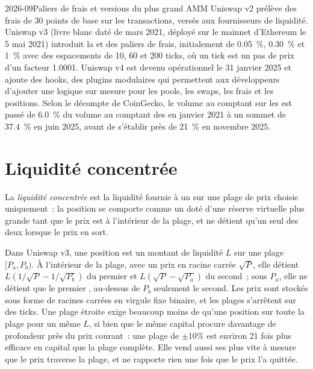 \begin{dated}{2026-09}{Paliers de frais et versions du plus grand AMM}\label{dat:m3:automated-market-makers:uniswap}
Uniswap v2 prélève des frais de 30 points de base sur les transactions, versés aux fournisseurs de liquidité. Uniswap v3 (livre blanc daté de mars 2021, déployé sur
le mainnet d'Ethereum le 5 mai 2021)
introduit la  et des paliers de frais, initialement de 0.05~\%, 0.30~\% et 1~\% avec des espacements de 10, 60 et 200 ticks,
où un tick est un pas de prix d'un facteur 1.0001. Uniswap v4 est devenu opérationnel le 31 janvier 2025 et ajoute des hooks, des plugins modulaires
qui permettent aux développeurs d'ajouter une logique sur mesure pour les pools, les swaps, les frais et les positions. Selon le décompte de CoinGecko, le volume au comptant sur les 
est passé de 6.0~\% du volume au comptant des  en janvier 2021 à un sommet de 37.4~\% en juin 2025, avant de s'établir près de 21~\% en novembre 2025.
\end{dated}

\section{Liquidité concentrée}

\begin{definition}\label{def:m3:automated-market-makers:concentrated}
La \emph{liquidité concentrée} est la liquidité fournie à un  sur
une plage de prix choisie uniquement~: la position se comporte comme un  doté d'une réserve virtuelle plus grande tant que le prix est
à l'intérieur de la plage, et ne détient qu'un seul des deux  lorsque le prix en sort.
\end{definition}

Dans Uniswap v3, une position est un montant de liquidité $L$ sur une plage $[P_a, P_b)$. À l'intérieur de la plage, avec un prix
en racine carrée $\sqrt{P}$, elle détient $L(1/\sqrt{P} - 1/\sqrt{P_b})$ du premier  et $L(\sqrt{P} - \sqrt{P_a})$ du second~; sous
$P_a$, elle ne détient que le premier , au-dessus de $P_b$ seulement le second. Les prix sont stockés sous forme de racines carrées en virgule fixe binaire,
et les plages s'arrêtent sur des ticks. Une plage étroite exige beaucoup moins de  qu'une position sur toute la plage pour un même $L$, si bien que le même
capital procure davantage de profondeur près du prix courant~: une plage de $\pm10\%$ est environ 21 fois plus efficace en capital que la
plage complète. Elle vend aussi ses  plus vite à mesure que le prix traverse la plage, et ne rapporte rien une fois que le prix
l'a quittée.

